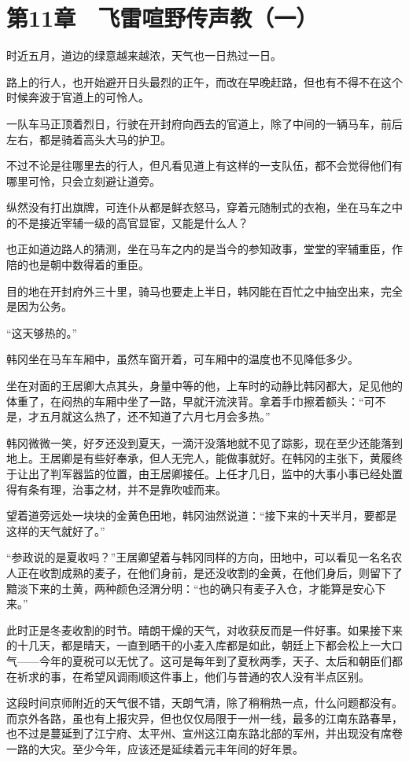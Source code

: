 \section{第11章　飞雷喧野传声教（一）}

时近五月，道边的绿意越来越浓，天气也一日热过一日。

路上的行人，也开始避开日头最烈的正午，而改在早晚赶路，但也有不得不在这个时候奔波于官道上的可怜人。

一队车马正顶着烈日，行驶在开封府向西去的官道上，除了中间的一辆马车，前后左右，都是骑着高头大马的护卫。

不过不论是往哪里去的行人，但凡看见道上有这样的一支队伍，都不会觉得他们有哪里可怜，只会立刻避让道旁。

纵然没有打出旗牌，可连仆从都是鲜衣怒马，穿着元随制式的衣袍，坐在马车之中的不是接近宰辅一级的高官显宦，又能是什么人？

也正如道边路人的猜测，坐在马车之内的是当今的参知政事，堂堂的宰辅重臣，作陪的也是朝中数得着的重臣。

目的地在开封府外三十里，骑马也要走上半日，韩冈能在百忙之中抽空出来，完全是因为公务。

“这天够热的。”

韩冈坐在马车车厢中，虽然车窗开着，可车厢中的温度也不见降低多少。

坐在对面的王居卿大点其头，身量中等的他，上车时的动静比韩冈都大，足见他的体重了，在闷热的车厢中坐了一路，早就汗流浃背。拿着手巾擦着额头：“可不是，才五月就这么热了，还不知道了六月七月会多热。”

韩冈微微一笑，好歹还没到夏天，一滴汗没落地就不见了踪影，现在至少还能落到地上。王居卿是有些好奉承，但人无完人，能做事就好。在韩冈的主张下，黄履终于让出了判军器监的位置，由王居卿接任。上任才几日，监中的大事小事已经处置得有条有理，治事之材，并不是靠吹嘘而来。

望着道旁远处一块块的金黄色田地，韩冈油然说道：“接下来的十天半月，要都是这样的天气就好了。”

“参政说的是夏收吗？”王居卿望着与韩冈同样的方向，田地中，可以看见一名名农人正在收割成熟的麦子，在他们身前，是还没收割的金黄，在他们身后，则留下了黯淡下来的土黄，两种颜色泾渭分明：“也的确只有麦子入仓，才能算是安心下来。”

此时正是冬麦收割的时节。晴朗干燥的天气，对收获反而是一件好事。如果接下来的十几天，都是晴天，一直到晒干的小麦入库都是如此，朝廷上下都会松上一大口气——今年的夏税可以无忧了。这可是每年到了夏秋两季，天子、太后和朝臣们都在祈求的事，在希望风调雨顺这件事上，他们与普通的农人没有半点区别。

这段时间京师附近的天气很不错，天朗气清，除了稍稍热一点，什么问题都没有。而京外各路，虽也有上报灾异，但也仅仅局限于一州一线，最多的江南东路春旱，也不过是蔓延到了江宁府、太平州、宣州这江南东路北部的军州，并出现没有席卷一路的大灾。至少今年，应该还是延续着元丰年间的好年景。


